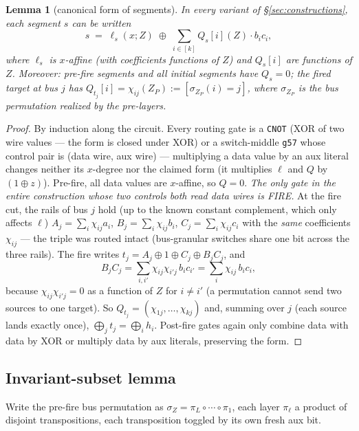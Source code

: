 \documentclass[11pt]{article}
\newtheorem{lemma}[theorem]{Lemma}
\theoremstyle{remark}
\newcommand{\g}{\texttt{g57}}
\newcommand{\CNOT}{\texttt{CNOT}}
\begin{document}
\begin{lemma}[canonical form of segments]\label{lem:structure}
In every variant of \S\ref{sec:constructions}, each segment $s$ can be written
\[
s\;=\;\ell_s(x;Z)\;\oplus\;\sum_{i\in[k]}Q_s[i](Z)\cdot b_ic_i ,
\]
where $\ell_s$ is $x$-affine (with coefficients functions of $Z$) and $Q_s[i]$ are functions of
$Z$. Moreover: pre-fire segments and all initial segments have $Q_s=0$; the fired target at bus
$j$ has $Q_{t_j}[i]=\chi_{ij}(Z_P):=[\sigma_{Z_P}(i)=j]$, where $\sigma_{Z_P}$ is the bus
permutation realized by the pre-layers.
\end{lemma}
\begin{proof}
By induction along the circuit. Every routing gate is a \CNOT{} (XOR of two wire values --- the
form is closed under XOR) or a switch-middle \g{} whose control pair is (data wire, aux wire) ---
multiplying a data value by an aux literal changes neither its $x$-degree nor the claimed form
(it multiplies $\ell$ and $Q$ by $(1\oplus z)$). Pre-fire, all data values are $x$-affine, so
$Q=0$. \emph{The only gate in the entire construction whose two controls both read data wires is
FIRE.} At the fire cut, the rails of bus $j$ hold (up to the known constant complement, which
only affects $\ell$)
$A_j=\sum_i\chi_{ij}a_i$, $B_j=\sum_i\chi_{ij}b_i$, $C_j=\sum_i\chi_{ij}c_i$ with the
\emph{same} coefficients $\chi_{ij}$ --- the triple was routed intact (bus-granular switches
share one bit across the three rails). The fire writes
$t_j=A_j\oplus1\oplus C_j\oplus B_jC_j$, and
\[
B_jC_j=\sum_{i,i'}\chi_{ij}\chi_{i'j}\,b_ic_{i'}=\sum_i\chi_{ij}\,b_ic_i ,
\]
because $\chi_{ij}\chi_{i'j}=0$ as a function of $Z$ for $i\neq i'$ (a permutation cannot send
two sources to one target). So $Q_{t_j}=(\chi_{1j},\dots,\chi_{kj})$ and, summing over $j$ (each
source lands exactly once), $\bigoplus_j t_j=\bigoplus_i h_i$. Post-fire gates again only
combine data with data by XOR or multiply data by aux literals, preserving the form.
\end{proof}

\subsection{Invariant-subset lemma}

Write the pre-fire bus permutation as $\sigma_Z=\pi_L\circ\cdots\circ\pi_1$, each layer
$\pi_\ell$ a product of disjoint transpositions, each transposition toggled by its own fresh aux
bit.
\end{document}
